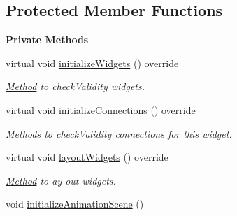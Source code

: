 \subsection*{Protected Member Functions}
\begin{Indent}\textbf{ Private Methods}\par
\begin{DoxyCompactItemize}
\item 
\mbox{\label{classrev_1_1_view_1_1_animation_node_widget_a6391916a3075dfd8869084f9316882b5}} 
virtual void \mbox{\hyperlink{classrev_1_1_view_1_1_animation_node_widget_a6391916a3075dfd8869084f9316882b5}{initialize\+Widgets}} () override
\begin{DoxyCompactList}\small\item\em \mbox{\hyperlink{struct_method}{Method}} to check\+Validity widgets. \end{DoxyCompactList}\item 
\mbox{\label{classrev_1_1_view_1_1_animation_node_widget_a2883050d03ec4dfc5a66f87178c5b269}} 
virtual void \mbox{\hyperlink{classrev_1_1_view_1_1_animation_node_widget_a2883050d03ec4dfc5a66f87178c5b269}{initialize\+Connections}} () override
\begin{DoxyCompactList}\small\item\em Methods to check\+Validity connections for this widget. \end{DoxyCompactList}\item 
\mbox{\label{classrev_1_1_view_1_1_animation_node_widget_af53b7d8b11c0b0a6778a0f8b1664425b}} 
virtual void \mbox{\hyperlink{classrev_1_1_view_1_1_animation_node_widget_af53b7d8b11c0b0a6778a0f8b1664425b}{layout\+Widgets}} () override
\begin{DoxyCompactList}\small\item\em \mbox{\hyperlink{struct_method}{Method}} to ay out widgets. \end{DoxyCompactList}\item 
\mbox{\label{classrev_1_1_view_1_1_animation_node_widget_a6c483a7f77b5e6fcf46dbe8b81282a89}} 
void \mbox{\hyperlink{classrev_1_1_view_1_1_animation_node_widget_a6c483a7f77b5e6fcf46dbe8b81282a89}{initialize\+Animation\+Scene}} ()

\end{DoxyCompactItemize}
\end{Indent}
